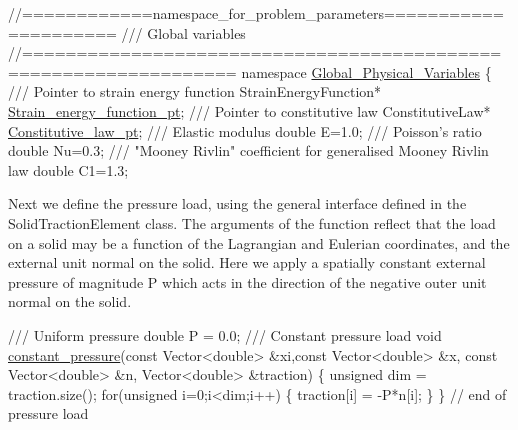  
\begin{DoxyCodeInclude}
\textcolor{comment}{//============namespace\_for\_problem\_parameters=====================}
\textcolor{comment}{/// Global variables}
\textcolor{comment}{}\textcolor{comment}{//=================================================================}
\textcolor{keyword}{namespace }\hyperlink{namespaceGlobal__Physical__Variables}{Global\_Physical\_Variables}
\{\textcolor{comment}{}
\textcolor{comment}{ /// Pointer to strain energy function}
\textcolor{comment}{} StrainEnergyFunction* \hyperlink{namespaceGlobal__Physical__Variables_a73135f793690b4386bf83bbefc7bf310}{Strain\_energy\_function\_pt};
\textcolor{comment}{}
\textcolor{comment}{ /// Pointer to constitutive law}
\textcolor{comment}{} ConstitutiveLaw* \hyperlink{namespaceGlobal__Physical__Variables_a2a37fb040c832ee7a086bb13bb02a100}{Constitutive\_law\_pt};
\textcolor{comment}{}
\textcolor{comment}{ /// Elastic modulus}
\textcolor{comment}{} \textcolor{keywordtype}{double} E=1.0; 
\textcolor{comment}{}
\textcolor{comment}{ /// Poisson's ratio}
\textcolor{comment}{} \textcolor{keywordtype}{double} Nu=0.3;
\textcolor{comment}{}
\textcolor{comment}{ /// "Mooney Rivlin" coefficient for generalised Mooney Rivlin law}
\textcolor{comment}{} \textcolor{keywordtype}{double} C1=1.3;

\end{DoxyCodeInclude}


Next we define the pressure load, using the general interface defined in the {\ttfamily Solid\+Traction\+Element} class. The arguments of the function reflect that the load on a solid may be a function of the Lagrangian and Eulerian coordinates, and the external unit normal on the solid. Here we apply a spatially constant external pressure of magnitude {\ttfamily P} which acts in the direction of the negative outer unit normal on the solid.


\begin{DoxyCodeInclude}
\textcolor{comment}{}
\textcolor{comment}{ /// Uniform pressure}
\textcolor{comment}{} \textcolor{keywordtype}{double} P = 0.0;
\textcolor{comment}{}
\textcolor{comment}{ /// Constant pressure load}
\textcolor{comment}{} \textcolor{keywordtype}{void} \hyperlink{namespaceGlobal__Physical__Variables_a19f4e20a92e7d216b4d2b00308f96917}{constant\_pressure}(\textcolor{keyword}{const} Vector<double> &xi,\textcolor{keyword}{const} Vector<double> &x,
                        \textcolor{keyword}{const} Vector<double> &n, Vector<double> &traction)
 \{
  \textcolor{keywordtype}{unsigned} dim = traction.size();
  \textcolor{keywordflow}{for}(\textcolor{keywordtype}{unsigned} i=0;i<dim;i++)
   \{
    traction[i] = -P*n[i];
   \}
 \} \textcolor{comment}{// end of pressure load}

\end{DoxyCodeInclude}


